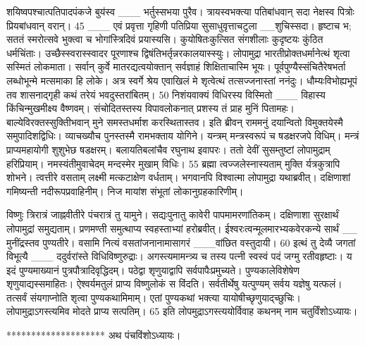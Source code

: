 शयिष्वपश्चात्पतिपादपंकजे बुय॑स्व
___ भर्तुस्सभया पुरैव।
 त्रायस्वभक्त्या पतिबांधवान् सदा
नेक्षस्व पित्रोः प्रियबांधवान् वरान्।
 45 ___ एवं प्रवृत्ता गृहिणी पतिप्रिया सुसाधुवृत्ताचटुला
__शुचिस्सदा।
 हृष्टाच भ; सततं स्मरोत्सवे भुक्त्वा च
भोगांस्त्रिदिवं प्रयास्यसि।
 कुयोषितःकुत्सित संगशीलाः कुदृष्टयः
कुंठित धर्मचिंताः।
 उच्छैस्स्वरास्स्वादर
पूरणाश्च द्विषंतिभर्तृन्नरकालयास्स्युः।
 लोपामुद्रा भारतीप्रोक्तधर्मानेत्थं शृत्वा
सस्मितं लोकमाता।
 सर्वान् कुर्वे मातरद्यत्वयोक्तान्
सर्वज्ञाहं शिक्षिताचास्मि भूयः।
 पूर्वपुण्यैस्संचितैरेषभर्ता लब्धोभून्मे
मत्समाका हि लोके।
 अत्र स्वर्गे श्रेय एवाखिलं मे शृत्वेत्थं
तत्सज्जनास्तां ननंदुः।
 धौम्यःविभोह्यभूपं तव शासनाद्गृही
कथं तरेयं भवदुस्तरांबितम्।
 50 निशंयवाक्यं विधिरस्य विस्मितो
___ विहास्य किंचिन्मुखमीक्ष्य वैष्णवम्।
 संचोदितस्तस्य विपावलोकनात् प्रशस्य
तं प्राह मुनिं पितामहः।
 बाल्येविरक्तस्सुक्तिीभवान् मुने
समस्तधर्माश करस्थितास्तव।
 इति ब्रीवन् राममनुं दयान्वितो
विमुक्तयेस्मै समुपादिशद्विधिः।
 व्याचख्यौच पुनस्तस्मै रामभक्ताय योगिने।
 यन्त्रम् मन्त्रस्वरूपं च षडक्षरजपे विधिम्।
 मन्त्रं प्राप्यमहायोगी शुशुभेछ षडक्षरम्।
 बलायतिबलांचैव रघुनाथ इवापरः।
 ततो देवीं सुसम्तुष्टां लोपामुद्राम् हरिप्रियाम्।
 नमस्यंतीमुवाचेदम् मन्दस्मेर मुखाम् विधिः।
 55
ब्रह्मा
त्वज्जलेस्नास्यताम् मुक्ति र्यत्रकुत्रापि शोभने।
 त्वत्तीरे वसताम् लक्ष्मी मत्कटाक्षेण वर्धताम्।
 भगवानपि विश्वात्मा लोपामुद्रा यथाब्रवीत्।
 दक्षिणाशां गमिष्यन्ती नदीरूपप्रवाहिनीम्।
 निज मायांश संभूतां लोकानुग्रहकारिणीम्।
 
विष्णुः
त्रिरात्रं जाह्नवीतीरे पंचरात्रं तु यामुने।
 सद्यःपुनातु कावेरी पापमामरणांतिकम्।
 दक्षिणाशा सुरक्षार्थं लोपामुद्रां समुद्यताम्।
 प्रणमण्ती समुत्थाप्य स्वहस्ताभ्यां हरोब्रवीत्।
 ईश्वरःत्वन्मूलमारभ्यकवेरकन्ये सार्थं
__ मुनींद्रस्तव पुण्यतीरे।
 वसामि नित्यं वसतांजनानामासागरं
___वांछित वस्तुदायी।
60 इत्थं तु देव्यै जगतां विभूत्यै
___ ददुर्वरांस्ते विधिविष्णुरुद्राः।
 अगस्त्यमामन्त्र्य च तस्य पत्नी स्वस्वं
पदं जग्मु रतीवहृष्टाः।
 य इदं पुण्यमाख्यानं पुत्रपौत्रादिवृद्धिदम्।
 पठेद्वा शृणुयाद्वापि सर्वपापैःप्रमुच्यते।
 पुण्यकालेविशेषेण शृणुयाद्यस्समाहितः।
 ऐश्वर्यमतुलं प्राप्य विष्णुलोकं स विंदति।
 सर्वतीर्थेषु यत्पुण्यम् सर्वय यज्ञेषु यत्फलं।
 तत्सर्वं संयगाप्नोति शृत्वा पुण्यकथामिमाम्।
 एतां पुण्यकथां भक्त्या यायोषीच्छृणुयाद्च्छुचिः।
 लोपामुद्राऽगस्त्यमिव मोदते प्राप्य सत्पतिम्।
 65
इति लोपमुद्राऽगस्त्ययोर्विवाह कथनम् नाम
चतुर्विंशोऽध्यायः।

********************
अथ पंचविंशोऽध्यायः।

